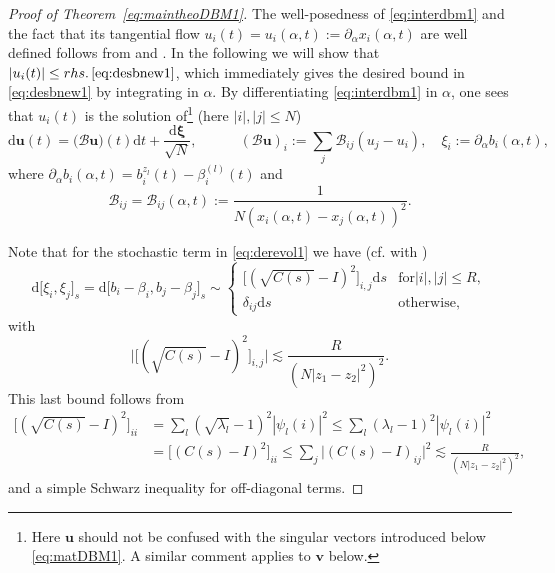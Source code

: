 \documentclass[10pt]{amsart}
\numberwithin{equation}{section}
\newcommand{\dif}{\mathrm{d}}
\begin{document}
\begin{proof}[Proof of Theorem~\ref{eq:maintheoDBM1}]
The well-posedness of \eqref{eq:interdbm1} and the fact that its tangential flow $u_i(t)=u_i(\alpha, t):=\partial_\alpha x_i(\alpha,t)$ are well defined follows from \cite[Appendix~A]{macroCLT_real} and \cite[Appendix~B]{bourgade2024fluctuations}. In the following we will show that $|u_i(t)|\le rhs. \, \eqref{eq:desbnew1}$, which immediately gives the desired bound in \eqref{eq:desbnew1} by integrating in $\alpha$. By differentiating \eqref{eq:interdbm1} in $\alpha$, one sees that $u_i(t)$ is the solution of\footnote{Here ${\bm u}$ should not be confused with the singular vectors introduced below \eqref{eq:matDBM1}. A similar comment applies to ${\bm v}$ below.} (here $|i|, |j|\le N$)
\begin{equation}
\label{eq:derevol1}
\dif {\bm u}(t)=\big(\mathcal{B}{\bm u}\big)(t)\dif t+\frac{\dif {\bm \xi}}{\sqrt{N}}, \qquad\quad (\mathcal{B}{\bm u})_i:=\sum_j\mathcal{B}_{ij}(u_j-u_i), \quad \xi_i:=\partial_\alpha  b_i(\alpha,t),
\end{equation}
where $\partial_\alpha  b_i(\alpha,t)=b_i^{z_l}(t)-\beta_i^{(l)}(t)$ and
\[
\mathcal{B}_{ij}=\mathcal{B}_{ij}(\alpha, t):=\frac{1}{N(x_i(\alpha, t)-x_j(\alpha, t))^2}.
\]


Note that for the stochastic term in \eqref{eq:derevol1} we have (cf. with \cite[Assumption~4.2]{bourgade2024fluctuations})
\begin{equation}
\label{eq:newstoch}
\dif \big[\xi_i,\xi_j\big]_s=\dif \big[ b_i-\beta_i, b_j-\beta_j\big]_s\sim \begin{cases}
\big[(\sqrt{C(s)}-I)^2\big]_{i,j}\dif s & \mathrm{for}  |i|, |j|\le R, \\
\delta_{ij}\dif s & \mathrm{otherwise},
\end{cases}
\end{equation}
with
\begin{equation}
\label{eq:betterbstochterm}
\big|\big[(\sqrt{C(s)}-I)^2\big]_{i,j}\big|\lesssim \frac{R}{(N|z_1-z_2|^2)^2}.
\end{equation}
This last bound follows from
\begin{equation}
\label{eq:betterb}
\begin{split}
\big[(\sqrt{C(s)}-I)^2\big]_{ii}&=\sum_l (\sqrt{\lambda_l}-1)^2|\psi_l(i)|^2\le \sum_l (\lambda_l-1)^2|\psi_l(i)|^2 \\
&= \big[(C(s)-I)^2\big]_{ii}\le \sum_j \big|(C(s)-I)_{ij}\big|^2\lesssim \frac{R}{(N|z_1-z_2|^2)^2},
\end{split}
\end{equation}
and a simple Schwarz inequality for off-diagonal terms.


\end{proof}
\end{document}
